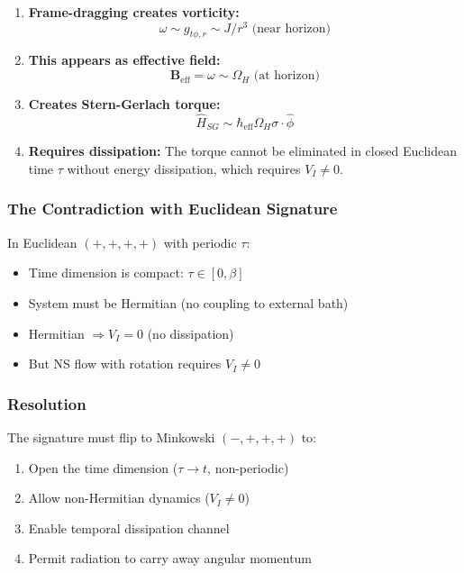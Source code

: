 \documentclass[11pt]{article}
\begin{document}
\begin{enumerate}
\item \textbf{Frame-dragging creates vorticity:}
\begin{equation}
\omega \sim g_{t\phi,r} \sim J/r^3 \text{ (near horizon)}
\end{equation}

\item \textbf{This appears as effective field:}
\begin{equation}
\mathbf{B}_{\text{eff}} = \omega \sim \Omega_H \text{ (at horizon)}
\end{equation}

\item \textbf{Creates Stern-Gerlach torque:}
\begin{equation}
\hat{H}_{SG} \sim \hbar_{\text{eff}} \Omega_H \sigma \cdot \hat{\phi}
\end{equation}

\item \textbf{Requires dissipation:}
The torque cannot be eliminated in closed Euclidean time $\tau$ without energy dissipation, which requires $V_I \neq 0$.
\end{enumerate}

\subsubsection{The Contradiction with Euclidean Signature}

In Euclidean $(+,+,+,+)$ with periodic $\tau$:
\begin{itemize}
\item Time dimension is compact: $\tau \in [0, \beta]$
\item System must be Hermitian (no coupling to external bath)
\item Hermitian $\Rightarrow V_I = 0$ (no dissipation)
\item But NS flow with rotation requires $V_I \neq 0$
\end{itemize}

\subsubsection{Resolution}

The signature must flip to Minkowski $(-,+,+,+)$ to:
\begin{enumerate}
\item Open the time dimension ($\tau \to t$, non-periodic)
\item Allow non-Hermitian dynamics ($V_I \neq 0$)
\item Enable temporal dissipation channel
\item Permit radiation to carry away angular momentum
\end{enumerate}
\end{document}
